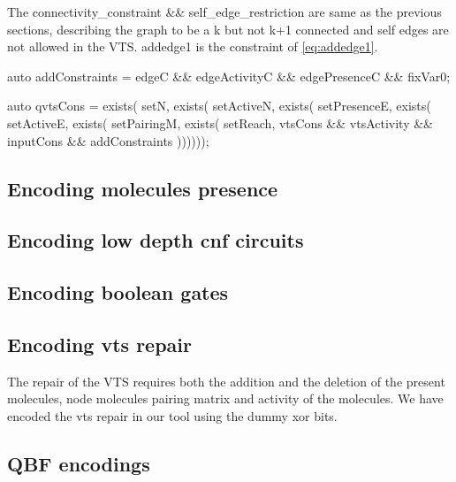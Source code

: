 The connectivity\_constraint \&\& self\_edge\_restriction are same as the previous sections, describing the graph to be a k but not k+1 connected and self edges are not allowed in the VTS. addedge1 is the constraint of \ref{eq:addedge1}.


    
    auto addConstraints = edgeC \&\& edgeActivityC \&\& edgePresenceC  \&\& fixVar0;

    auto qvtsCons = exists( setN, 
                    exists( setActiveN, 
                    exists( setPresenceE,  
                    exists( setActiveE, 
                    exists( setPairingM, 
                    exists( setReach, 
                            vtsCons \&\& vtsActivity \&\& inputCons \&\& addConstraints ))))));   

 
\subsection{Encoding molecules presence}

\subsection{Encoding low depth cnf circuits}

\subsection{Encoding boolean gates}

\subsection{Encoding vts repair}
The repair of the VTS requires both the addition and the deletion of the present molecules, node molecules pairing matrix and activity of the molecules. We have encoded the vts repair in our tool using the dummy xor bits.


\subsection{QBF encodings}




